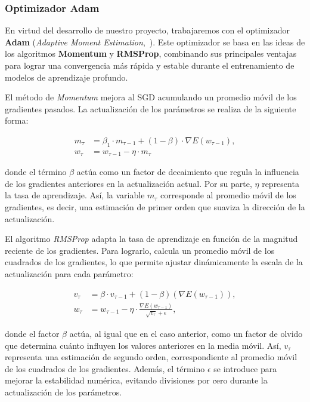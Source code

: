\subsubsection{Optimizador Adam}\label{subsubsec:optimizador-adam}
En virtud del desarrollo de nuestro proyecto, trabajaremos con el optimizador \textbf{Adam} (\textit{Adaptive Moment Estimation},~\cite{Diederik2017}). Este optimizador se basa en las ideas de los algoritmos \textbf{Momentum} y \textbf{RMSProp}, combinando sus principales ventajas para lograr una convergencia más rápida y estable durante el entrenamiento de modelos de aprendizaje profundo.\newline

El método de \textit{Momentum} mejora al SGD acumulando un promedio móvil de los gradientes pasados. La actualización de los parámetros se realiza de la siguiente forma:

\[
    \begin{aligned}
        m_{\tau} &= \beta_1 \cdot m_{\tau-1} + (1 - \beta) \cdot \nabla E(w_{\tau - 1}), \\
        w_{\tau} &= w_{\tau - 1} - \eta \cdot m_\tau
    \end{aligned}
\]

donde el término $\beta$ actúa como un factor de decaimiento que regula la influencia de los gradientes anteriores en la actualización actual. Por su parte, $\eta$ representa la tasa de aprendizaje. Así, la variable $m_{\tau}$ corresponde al promedio móvil de los gradientes, es decir, una estimación de primer orden que suaviza la dirección de la actualización.\newline

El algoritmo \textit{RMSProp} adapta la tasa de aprendizaje en función de la magnitud reciente de los gradientes. Para lograrlo, calcula un promedio móvil de los cuadrados de los gradientes, lo que permite ajustar dinámicamente la escala de la actualización para cada parámetro:

\[
    \begin{aligned}
        v_{\tau} &= \beta \cdot v_{\tau-1} + (1- \beta)(\nabla E(w_{\tau-1})), \\
        w_{\tau} &= w_{\tau-1} - \eta \cdot \frac{\nabla E(w_{\tau-1})}{\sqrt{v_{\tau}}+\epsilon},
    \end{aligned}
\]

donde el factor $\beta$ actúa, al igual que en el caso anterior, como un factor de olvido que determina cuánto influyen los valores anteriores en la media móvil. Así, $v_{\tau}$ representa una estimación de segundo orden, correspondiente al promedio móvil de los cuadrados de los gradientes. Además, el término $\epsilon$ se introduce para mejorar la estabilidad numérica, evitando divisiones por cero durante la actualización de los parámetros.\newline

